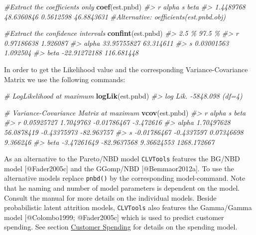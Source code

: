 \documentclass[
]{article}
\newenvironment{Shaded}{\begin{snugshade}}{\end{snugshade}}
\newcommand{\CommentTok}[1]{\textcolor[rgb]{0.56,0.35,0.01}{\textit{#1}}}
\newcommand{\FunctionTok}[1]{\textcolor[rgb]{0.13,0.29,0.53}{\textbf{#1}}}
\newcommand{\NormalTok}[1]{#1}
\begin{document}
\begin{Shaded}
\begin{Highlighting}[]
\CommentTok{\#Extract the coefficients only}
\FunctionTok{coef}\NormalTok{(est.pnbd)}
\CommentTok{\#\textgreater{}          r      alpha          s       beta }
\CommentTok{\#\textgreater{}  1.4489768 48.6360846  0.5612598 46.8843631}
\CommentTok{\#Alternative: oefficients(est.pnbd.obj)}

\CommentTok{\#Extract the confidence intervals}
\FunctionTok{confint}\NormalTok{(est.pnbd)}
\CommentTok{\#\textgreater{}              2.5 \%     97.5 \%}
\CommentTok{\#\textgreater{} r       0.97186638   1.926087}
\CommentTok{\#\textgreater{} alpha  33.95755827  63.314611}
\CommentTok{\#\textgreater{} s       0.03001563   1.092504}
\CommentTok{\#\textgreater{} beta  {-}22.91272188 116.681448}
\end{Highlighting}
\end{Shaded}

In order to get the Likelihood value and the corresponding
Variance-Covariance Matrix we use the following commands:

\begin{Shaded}
\begin{Highlighting}[]
\CommentTok{\# LogLikelihood at maximum}
\FunctionTok{logLik}\NormalTok{(est.pnbd)}
\CommentTok{\#\textgreater{} \textquotesingle{}log Lik.\textquotesingle{} {-}5848.098 (df=4)}

\CommentTok{\# Variance{-}Covariance Matrix at maximum}
\FunctionTok{vcov}\NormalTok{(est.pnbd)}
\CommentTok{\#\textgreater{}                 r       alpha           s        beta}
\CommentTok{\#\textgreater{} r      0.05925727   1.7049763 {-}0.01786467   {-}3.472616}
\CommentTok{\#\textgreater{} alpha  1.70497628  56.0878419 {-}0.43375973  {-}82.963757}
\CommentTok{\#\textgreater{} s     {-}0.01786467  {-}0.4337597  0.07346698    9.366246}
\CommentTok{\#\textgreater{} beta  {-}3.47261649 {-}82.9637568  9.36624553 1268.172667}
\end{Highlighting}
\end{Shaded}

As an alternative to the Pareto/NBD model \texttt{CLVTools} features the
BG/NBD model {[}@Fader2005c{]} and the GGomp/NBD {[}@Bemmaor2012a{]}. To
use the alternative models replace \texttt{pnbd()} by the corresponding
model-command. Note that he naming and number of model parameters is
dependent on the model. Consult the manual for more details on the
individual models. Beside probabilistic latent attrition models,
\texttt{CLVTools} also features the Gamma/Gamma model {[}@Colombo1999;
@Fader2005c{]} which is used to predict customer spending. See section
\hyperref[spending]{Customer Spending} for details on the spending
model.
\end{document}
